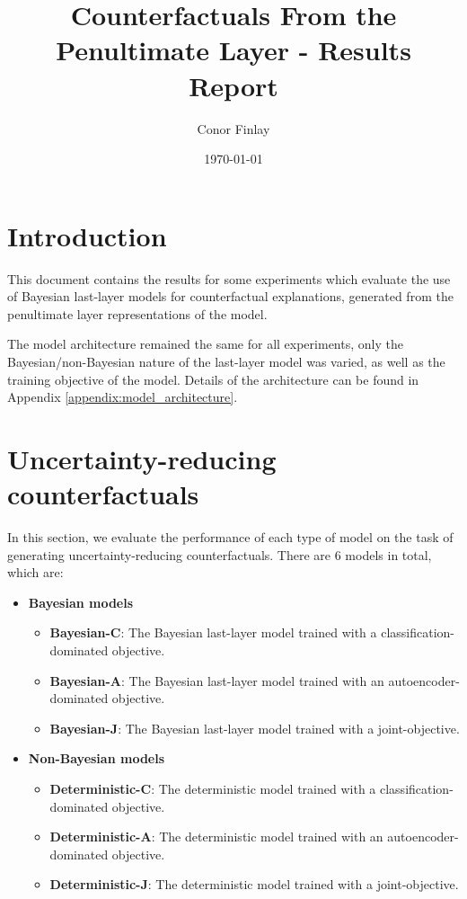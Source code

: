 \documentclass{article}
\title{Counterfactuals From the Penultimate Layer - Results Report}
\author{Conor Finlay}
\date{\today}
\begin{document}
\maketitle

\section{Introduction}

This document contains the results for some experiments which evaluate the use of Bayesian last-layer models for counterfactual explanations, generated from the penultimate layer representations of the model.

The model architecture remained the same for all experiments, only the Bayesian/non-Bayesian nature of the last-layer model was varied, as well as the training objective of the model. Details of the architecture can be found in Appendix \ref{appendix:model_architecture}.

\section{Uncertainty-reducing counterfactuals}
In this section, we evaluate the performance of each type of model on the task of generating uncertainty-reducing counterfactuals. There are 6 models in total, which are:

\begin{itemize}
    \item \textbf{Bayesian models}
    \begin{itemize}
        \item \textbf{Bayesian-C}: The Bayesian last-layer model trained with a classification-dominated objective.
        \item \textbf{Bayesian-A}: The Bayesian last-layer model trained with an autoencoder-dominated objective.
        \item \textbf{Bayesian-J}: The Bayesian last-layer model trained with a joint-objective.
    \end{itemize}
    \item \textbf{Non-Bayesian models}  
    \begin{itemize}
        \item \textbf{Deterministic-C}: The deterministic model trained with a classification-dominated objective.
        \item \textbf{Deterministic-A}: The deterministic model trained with an autoencoder-dominated objective.
        \item \textbf{Deterministic-J}: The deterministic model trained with a joint-objective.
    \end{itemize}
\end{itemize}
\end{document}
